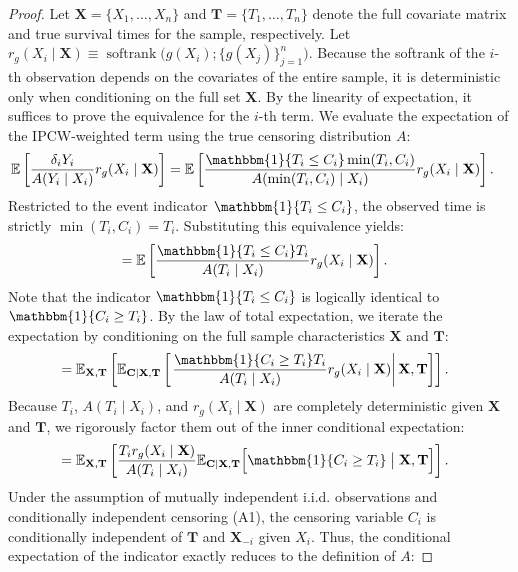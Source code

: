 \documentclass[11pt]{article}
\theoremstyle{plain}
\theoremstyle{plain}
\theoremstyle{plain}
\theoremstyle{plain}
\theoremstyle{plain}
\theoremstyle{plain}
\theoremstyle{plain}
\begin{document}
\begin{proof}
Let $\mathbf{X} = \{X_1, \dots, X_n\}$ and $\mathbf{T} = \{T_1, \dots, T_n\}$ denote the full covariate matrix and true survival times for the sample, respectively. Let $r_g(X_i \mid \mathbf{X}) \equiv \operatorname{softrank}\big(g(X_i);\{g(X_j)\}_{j=1}^{n}\big)$. Because the softrank of the $i$-th observation depends on the covariates of the entire sample, it is deterministic only when conditioning on the full set $\mathbf{X}$. By the linearity of expectation, it suffices to prove the equivalence for the $i$-th term. We evaluate the expectation of the IPCW-weighted term using the true censoring distribution $A$:
\begin{align}
    \mathbb{E} \left[ \frac{\delta_i Y_i}{A(Y_i \mid X_i)} r_g(X_i \mid \mathbf{X}) \right] &= \mathbb{E} \left[ \frac{\mathbbm{1}\{T_i \le C_i\} \min(T_i, C_i)}{A(\min(T_i, C_i) \mid X_i)} r_g(X_i \mid \mathbf{X}) \right].
\end{align}
Restricted to the event indicator $\mathbbm{1}\{T_i \le C_i\}$, the observed time is strictly $\min(T_i, C_i) = T_i$. Substituting this equivalence yields:
\begin{align}
    &= \mathbb{E} \left[ \frac{\mathbbm{1}\{T_i \le C_i\} T_i}{A(T_i \mid X_i)} r_g(X_i \mid \mathbf{X}) \right].
\end{align}
Note that the indicator $\mathbbm{1}\{T_i \le C_i\}$ is logically identical to $\mathbbm{1}\{C_i \ge T_i\}$. By the law of total expectation, we iterate the expectation by conditioning on the full sample characteristics $\mathbf{X}$ and $\mathbf{T}$:
\begin{align}
    &= \mathbb{E}_{\mathbf{X}, \mathbf{T}} \left[ \mathbb{E}_{\mathbf{C} \mid \mathbf{X}, \mathbf{T}} \left[ \left. \frac{\mathbbm{1}\{C_i \ge T_i\} T_i}{A(T_i \mid X_i)} r_g(X_i \mid \mathbf{X}) \right| \mathbf{X}, \mathbf{T} \right] \right].
\end{align}
Because $T_i$, $A(T_i \mid X_i)$, and $r_g(X_i \mid \mathbf{X})$ are completely deterministic given $\mathbf{X}$ and $\mathbf{T}$, we rigorously factor them out of the inner conditional expectation:
\begin{align}
    &= \mathbb{E}_{\mathbf{X}, \mathbf{T}} \left[ \frac{T_i r_g(X_i \mid \mathbf{X})}{A(T_i \mid X_i)} \mathbb{E}_{\mathbf{C} \mid \mathbf{X}, \mathbf{T}} \Big[ \mathbbm{1}\{C_i \ge T_i\} \;\big|\; \mathbf{X}, \mathbf{T} \Big] \right].
\end{align}
Under the assumption of mutually independent i.i.d. observations and conditionally independent censoring (A1), the censoring variable $C_i$ is conditionally independent of $\mathbf{T}$ and $\mathbf{X}_{-i}$ given $X_i$. Thus, the conditional expectation of the indicator exactly reduces to the definition of $A$:

\end{proof}
\end{document}
